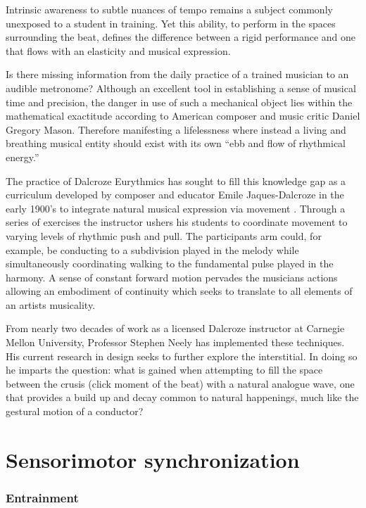 Intrinsic awareness to subtle nuances of tempo remains a subject commonly unexposed to a student in training. Yet this ability, to perform in the spaces surrounding the beat, defines the difference between a rigid performance and one that flows with an elasticity and musical expression.

Is there missing information from the daily practice of a trained musician to an audible metronome? Although an excellent tool in establishing a sense of musical time and precision, the danger in use of such a mechanical object lies within the mathematical exactitude according to American composer and music critic Daniel Gregory Mason. Therefore manifesting a lifelessness where instead a living and breathing musical entity should exist with its own ``ebb and flow of rhythmical energy.''\cite{fitts2008new}

The practice of Dalcroze Eurythmics has sought to fill this knowledge gap as a curriculum developed by composer and educator Emile Jaques-Dalcroze in the early 1900's to integrate natural musical expression via movement \cite{jaques1930eurhythmics}. Through a series of exercises the instructor ushers his students to coordinate movement to varying levels of rhythmic push and pull. The participants arm could, for example, be conducting to a subdivision played in the melody while simultaneously coordinating walking to the fundamental pulse played in the harmony. A sense of constant forward motion pervades the musicians actions allowing an embodiment of continuity which seeks to translate to all elements of an artists musicality.

From nearly two decades of work as a licensed Dalcroze instructor at Carnegie Mellon University, Professor Stephen Neely has implemented these techniques. His current research in design seeks to further explore the interstitial. In doing so he imparts the question: what is gained when attempting to fill the space between the crusis (click moment of the beat) with a natural analogue wave, one that provides a build up and decay common to natural happenings, much like the gestural motion of a conductor?

\section{Sensorimotor synchronization}
\subsubsection{Entrainment}

